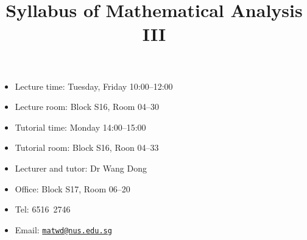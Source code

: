 \documentclass[a4paper]{article}
\title{Syllabus of Mathematical Analysis III}
\date{}
\begin{document}
\maketitle

\begin{minipage}[t]{0.5\linewidth}
  \begin{itemize}[leftmargin=*]
  \item Lecture time: Tuesday, Friday 10:00--12:00
  \item Lecture room: Block S16, Room 04--30
  \item Tutorial time: Monday 14:00--15:00
  \item Tutorial room: Block S16, Roon 04--33 
  \end{itemize}
\end{minipage}
\begin{minipage}[t]{0.4\linewidth}
  \begin{itemize}
  \item Lecturer and tutor: Dr Wang Dong
  \item Office: Block S17, Room 06--20
  \item Tel: 6516\ 2746
  \item Email: \href{mailto:matwd@nus.edu.sg}{\nolinkurl{matwd@nus.edu.sg}}
  \end{itemize}
\end{minipage}
\end{document}
